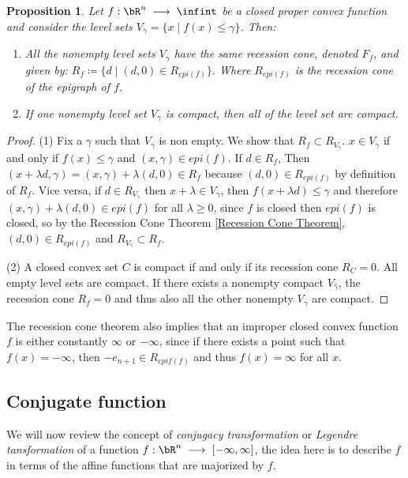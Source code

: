 \documentclass[11pt,a4paper,oneside,openany]{book}
\newtheorem{prop}[theorem]{Proposition}
\numberwithin{definition}{section}
\numberwithin{theorem}{section}
\numberwithin{problem}{section}
\newcommand{\la}{\; \longrightarrow \;}
\begin{document}
\begin{prop}
    Let $f: \bR^n \la \infint$ be a closed proper convex function and consider the level sets \(V_{\gamma} = \{x \mid f(x) \leq \gamma\}\). Then:
    \begin{enumerate}
        \item All the nonempty level sets $V_{\gamma}$ have the same recession cone, denoted $F_f$, and given by: $R_f \coloneqq \{d \mid (d,0) \in R_{epi(f)}\}$. Where $R_{epi(f)}$ is the recession cone of the epigraph of \(f\).
        \item If one nonempty level set $V_{\gamma}$ is compact, then all of the level set are compact.
    \end{enumerate}
\end{prop}
\begin{proof}
    (1) Fix a $\gamma$ such that $V_{\gamma}$ is non empty. We show that $R_f \subset R_{V_{\gamma}}$.  $x \in V_{\gamma}$ if and only if $f(x) \leq \gamma$ and $(x, \gamma) \in epi(f)$. If \(d \in R_f\), Then $(x + \lambda d, \gamma) = (x,\gamma) + \lambda (d,0) \in R_f$ because $(d,0) \in R_{epi(f)}$ by definition of $R_f$. Vice versa, if $d \in R_{V_{\gamma}}$ then $x + \lambda \in V_{\gamma}$, then $f(x + \lambda d) \leq \gamma$ and therefore $(x,\gamma) + \lambda (d,0) \in epi(f)$ for all $\lambda \geq 0$, since $f$ is closed then \(epi(f)\) is closed, so by the Recession Cone Theorem \ref{Recession Cone Theorem}, $(d,0) \in R_{epi(f)}$ and $R_{V_{\gamma}} \subset R_f$.
    
   (2) A closed convex set $C$ is compact if and only if its recession cone $R_C = {0}$. All empty level sets are compact. If there exists a nonempty compact $V_{\hat \gamma}$, the recession cone $R_f = 0$ and thus also all the other nonempty $V_{\gamma}$ are compact.
\end{proof}

The recession cone theorem also implies that an improper closed convex function $f$ is either constantly $\infty$ or $-\infty$, since if there exists a point such that $f(x) = -\infty$, then $-e_{n+1} \in R_{epif(f)}$ and thus $f(x) = \infty$ for all $x$.

\subsection{Conjugate function}
We will now review the concept of \emph{conjugacy transformation} or \emph{Legendre tansformation} of a function $f: \bR^n \la [-\infty, \infty]$, the idea here is to describe $f$ in terms of the affine functions that are majorized by $f$.
\end{document}
